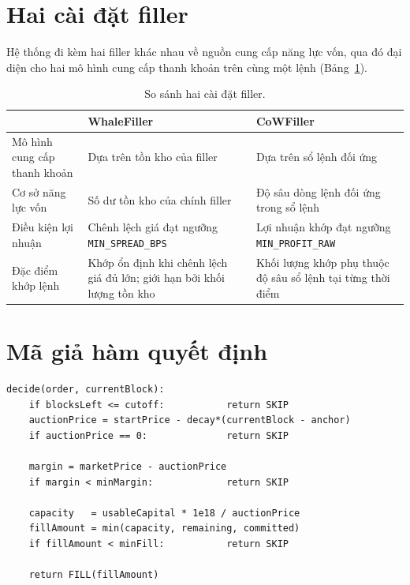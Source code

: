 \documentclass[../DoAn.tex]{subfiles}
\begin{document}
\section{Hai cài đặt filler}

Hệ thống đi kèm hai filler khác nhau về nguồn cung cấp năng lực vốn, qua đó đại diện cho hai mô hình cung cấp thanh khoản trên cùng một lệnh (Bảng~\ref{table:filler_compare}).

\begin{table}[H]
    \centering
    \caption{So sánh hai cài đặt filler.}
    \label{table:filler_compare}
    \begin{tabular}{|>{\raggedright\arraybackslash}p{3.8cm}|>{\raggedright\arraybackslash}p{5.0cm}|>{\raggedright\arraybackslash}p{5.0cm}|}
        \hline
        & \textbf{WhaleFiller} & \textbf{CoWFiller} \\
        \hline
        Mô hình cung cấp thanh khoản & Dựa trên tồn kho của filler & Dựa trên sổ lệnh đối ứng \\
        \hline
        Cơ sở năng lực vốn & Số dư tồn kho của chính filler & Độ sâu dòng lệnh đối ứng trong sổ lệnh \\
        \hline
        Điều kiện lợi nhuận & Chênh lệch giá đạt ngưỡng \mbox{\texttt{MIN\_SPREAD\_BPS}} & Lợi nhuận khớp đạt ngưỡng \mbox{\texttt{MIN\_PROFIT\_RAW}} \\
        \hline
        Đặc điểm khớp lệnh & Khớp ổn định khi chênh lệch giá đủ lớn; giới hạn bởi khối lượng tồn kho & Khối lượng khớp phụ thuộc độ sâu sổ lệnh tại từng thời điểm \\
        \hline
    \end{tabular}
\end{table}

\section{Mã giả hàm quyết định}

\begin{lstlisting}[caption={Quy tắc quyết định khớp lệnh của filler.},numbers=none]
decide(order, currentBlock):
    if blocksLeft <= cutoff:           return SKIP
    auctionPrice = startPrice - decay*(currentBlock - anchor)
    if auctionPrice == 0:              return SKIP

    margin = marketPrice - auctionPrice
    if margin < minMargin:             return SKIP

    capacity   = usableCapital * 1e18 / auctionPrice
    fillAmount = min(capacity, remaining, committed)
    if fillAmount < minFill:           return SKIP

    return FILL(fillAmount)
\end{lstlisting}
\end{document}
